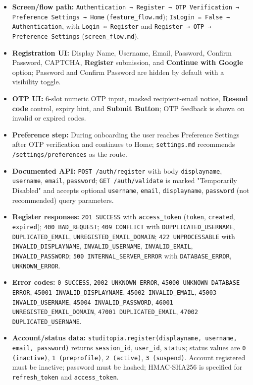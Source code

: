 \documentclass[12pt]{article}
\begin{document}
\begin{itemize}
\item \textbf{Screen/flow path:} \texttt{Authentication → Register → OTP Verification → Preference Settings → Home} (\texttt{feature\_flow.md}); \texttt{IsLogin = False → Authentication}, with \texttt{Login ↔ Register} and \texttt{Register → OTP → Preference Settings} (\texttt{screen\_flow.md}).
\item \textbf{Registration UI:} Display Name, Username, Email, Password, Confirm Password, CAPTCHA, \textbf{Register} submission, and \textbf{Continue with Google} option; Password and Confirm Password are hidden by default with a visibility toggle.
\item \textbf{OTP UI:} 6-slot numeric OTP input, masked recipient-email notice, \textbf{Resend code} control, expiry hint, and \textbf{Submit Button}; OTP feedback is shown on invalid or expired codes.
\item \textbf{Preference step:} During onboarding the user reaches Preference Settings after OTP verification and continues to Home; \texttt{settings.md} recommends \texttt{/settings/preferences} as the route.
\item \textbf{Documented API:} \texttt{POST /auth/register} with body \texttt{displayname}, \texttt{username}, \texttt{email}, \texttt{password}; \texttt{GET /auth/validate} is marked "Temporarily Disabled" and accepts optional \texttt{username}, \texttt{email}, \texttt{displayname}, \texttt{password} (not recommended) query parameters.
\item \textbf{Register responses:} \texttt{201 SUCCESS} with \texttt{access\_token} (\texttt{token}, \texttt{created}, \texttt{expired}); \texttt{400 BAD\_REQUEST}; \texttt{409 CONFLICT} with \texttt{DUPPLICATED\_USERNAME}, \texttt{DUPLICATED\_EMAIL}, \texttt{UNREGISTED\_EMAIL\_DOMAIN}; \texttt{422 UNPROCESSABLE} with \texttt{INVALID\_DISPLAYNAME}, \texttt{INVALID\_USERNAME}, \texttt{INVALID\_EMAIL}, \texttt{INVALID\_PASSWORD}; \texttt{500 INTERNAL\_SERVER\_ERROR} with \texttt{DATABASE\_ERROR}, \texttt{UNKNOWN\_ERROR}.
\item \textbf{Error codes:} \texttt{0 SUCCESS}, \texttt{2002 UNKNOWN ERROR}, \texttt{45000 UNKNOWN DATABASE ERROR}, \texttt{45001 INVALID\_DISPLAYNAME}, \texttt{45002 INVALID\_EMAIL}, \texttt{45003 INVALID\_USERNAME}, \texttt{45004 INVALID\_PASSWORD}, \texttt{46001 UNREGISTED\_EMAIL\_DOMAIN}, \texttt{47001 DUPLICATED\_EMAIL}, \texttt{47002 DUPLICATED\_USERNAME}.
\item \textbf{Account/status data:} \texttt{studitopia.register(displayname, username, email, password)} returns \texttt{session\_id}, \texttt{user\_id}, \texttt{status}; status values are \texttt{0 (inactive)}, \texttt{1 (preprofile)}, \texttt{2 (active)}, \texttt{3 (suspend)}. Account registered must be inactive; password must be hashed; HMAC-SHA256 is specified for \texttt{refresh\_token} and \texttt{access\_token}.

\end{itemize}
\end{document}
